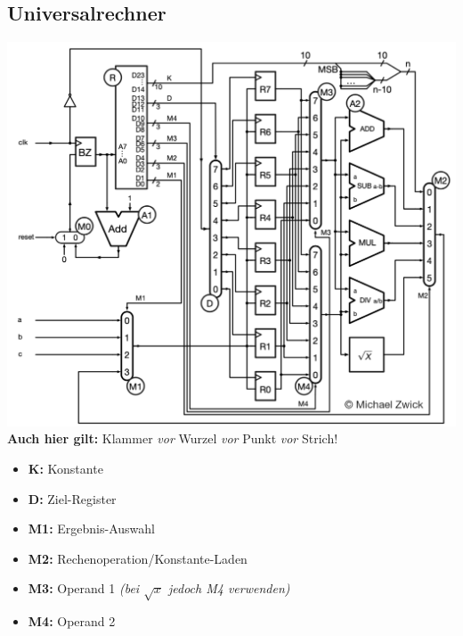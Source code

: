 \documentclass[german, threecolumn, 8pt]{latex4ei/latex4ei_sheet}
\begin{document}
\begin{sectionbox}
\subsection{Universalrechner}
\includegraphics[width=.9\linewidth]{img/Universalrechner.png} \\
\textbf{Auch hier gilt:} Klammer \textit{vor} Wurzel \textit{vor} Punkt \textit{vor} Strich!
\begin{itemize}\itemsep0pt
\item \textbf{K:} Konstante
\item \textbf{D:} Ziel-Register
\item \textbf{M1:} Ergebnis-Auswahl
\item \textbf{M2:} Rechenoperation/Konstante-Laden
\item \textbf{M3:} Operand 1 \textit{(bei $\sqrt{x}$ jedoch M4 verwenden)}
\item \textbf{M4:} Operand 2
\end{itemize}
\end{sectionbox}
\end{document}
